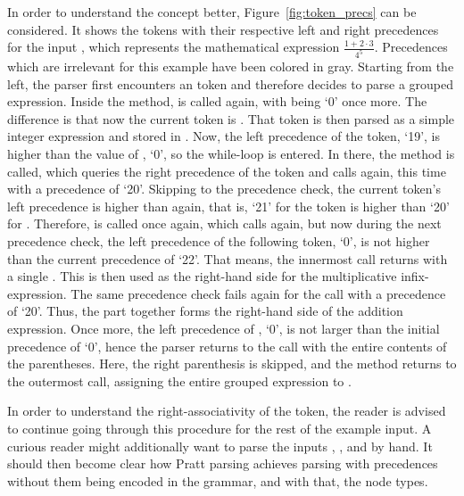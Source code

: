 In order to understand the concept better, Figure~\ref{fig:token_precs} can be considered.
It shows the tokens with their respective left and right precedences for the input , which represents the mathematical expression $\frac{1+2\cdot3}{4^5}$.
Precedences which are irrelevant for this example have been colored in gray.
Starting from the left, the parser first encounters an  token and therefore decides to parse a grouped expression.
Inside the  method,  is called again, with  being `0' once more.
The difference is that now the current token is .
That token is then parsed as a simple integer expression and stored in .
Now, the left precedence of the  token, `19', is higher than the value of , `0', so the while-loop is entered.
In there, the  method is called, which queries the right precedence of the  token and calls  again, this time with a precedence of `20'.
Skipping to the precedence check, the current token's left precedence is higher than  again, that is, `21' for the  token is higher than `20' for .
Therefore,  is called once again, which calls  again, but now during the next precedence check, the left precedence of the following  token, `0', is not higher than the current precedence of `22'.
That means, the innermost  call returns with a single .
This  is then used as the right-hand side for the multiplicative infix-expression.
The same  precedence check fails again for the  call with a precedence of `20'.
Thus, the  part together forms the right-hand side of the addition expression.
Once more, the left precedence of , `0', is not larger than the initial precedence of `0', hence the parser returns to the  call with the entire contents of the parentheses.
Here, the right parenthesis is skipped, and the method returns to the outermost  call, assigning the entire grouped expression to .

In order to understand the right-associativity of the  token, the reader is advised to continue going through this procedure for the rest of the example input.
A curious reader might additionally want to parse the inputs , , and  by hand.
It should then become clear how Pratt parsing achieves parsing with precedences without them being encoded in the grammar, and with that, the node types.


